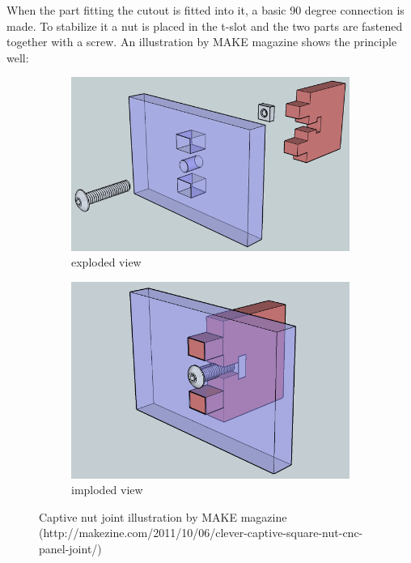 \documentclass[11pt,a4paper]{article}
\begin{document}
When the part fitting the cutout is fitted into it, a basic 90 degree connection is made. To stabilize it a nut is placed in the t-slot and the two parts are fastened together with a screw. An illustration by MAKE magazine shows the principle well:
 
\begin{figure}[H]
  \centering
  \begin{subfigure}{0.48\textwidth}
  \centering
  \includegraphics[width=0.9\linewidth]{images/captive-square-nut-joint-exploded.png}
  \caption{exploded view}
  \end{subfigure}
  \begin{subfigure}{0.48\textwidth}
  \centering
  \includegraphics[width=0.9\linewidth]{images/captive-square-nut-joint-imploded.png}
  \caption{imploded view}
  \end{subfigure}
  \caption{Captive nut joint illustration by MAKE magazine (http://makezine.com/2011/10/06/clever-captive-square-nut-cnc-panel-joint/) }
\end{figure} 
 
\end{document}
